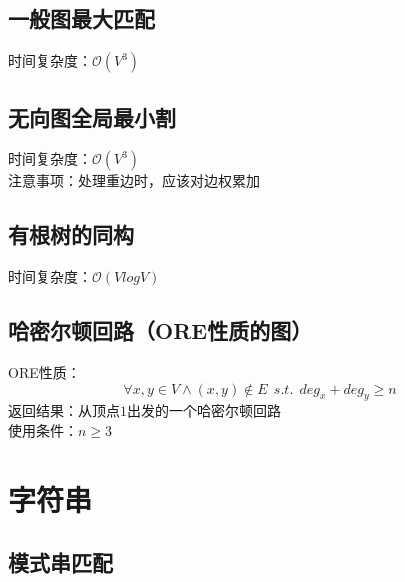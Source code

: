 \documentclass[openany, a4paper, 10pt]{book}
\begin{document}
\begin{spacing}{1.0}
		\section{一般图最大匹配}
			时间复杂度：$\mathcal{O}(V^3)$
			
		\section{无向图全局最小割}
			时间复杂度：$\mathcal{O}(V^3)$\\
			\indent 注意事项：处理重边时，应该对边权累加
			
		\section{有根树的同构}
			时间复杂度：$\mathcal{O}(V log V)$
			
		\section{哈密尔顿回路（ORE性质的图）}
			ORE性质：$$\forall x,y \in V \wedge (x,y) \notin E \ \ s.t. \ \ deg_x+deg_y \geq n$$
			\indent 返回结果：从顶点$1$出发的一个哈密尔顿回路\\
			\indent 使用条件：$n \geq 3$
			
	\chapter{字符串}
		\section{模式串匹配}
			

\end{spacing}
\end{document}
